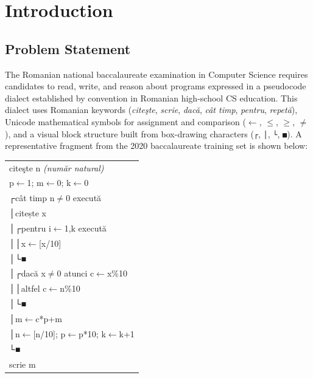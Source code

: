 \chapter{Introduction}
\label{chap:introduction}

\section{Problem Statement}
\label{sec:problem}

The Romanian national baccalaureate examination in Computer Science requires
candidates to read, write, and reason about programs expressed in a
pseudocode dialect established by convention in Romanian high-school CS
education.  This dialect uses Romanian keywords (\textit{citeşte}, \textit{scrie},
\textit{dacă}, \textit{cât timp}, \textit{pentru}, \textit{repetă}),
Unicode mathematical symbols for assignment and comparison
($\leftarrow$, $\leq$, $\geq$, $\neq$), and a visual block structure built
from box-drawing characters
(\texttt{┌}, \texttt{│}, \texttt{└}, \texttt{■}).
A representative fragment from the 2020 baccalaureate training set is
shown below:

\begin{center}
\ttfamily\small
\begin{tabular}{l}
citeşte n \textit{(număr natural)}            \\
p$\leftarrow$1; m$\leftarrow$0; k$\leftarrow$0 \\
┌cât timp n$\neq$0 execută                     \\
│\phantom{x}citește x                          \\
│┌pentru i$\leftarrow$1,k execută              \\
││\phantom{x}x$\leftarrow$[x/10]              \\
│└■                                            \\
│┌dacă x$\neq$0 atunci c$\leftarrow$x\%10     \\
││altfel c$\leftarrow$n\%10                    \\
│└■                                            \\
│\phantom{x}m$\leftarrow$c*p+m                \\
│\phantom{x}n$\leftarrow$[n/10]; p$\leftarrow$p*10; k$\leftarrow$k+1 \\
└■                                             \\
scrie m
\end{tabular}
\end{center}

